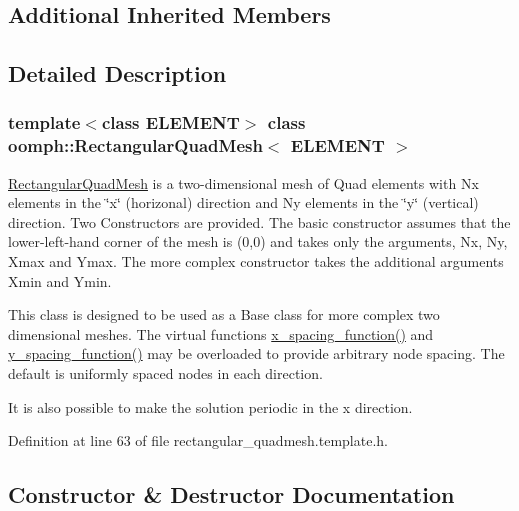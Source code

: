 \subsection*{Additional Inherited Members}


\subsection{Detailed Description}
\subsubsection*{template$<$class E\+L\+E\+M\+E\+NT$>$\newline
class oomph\+::\+Rectangular\+Quad\+Mesh$<$ E\+L\+E\+M\+E\+N\+T $>$}

\hyperlink{classoomph_1_1RectangularQuadMesh}{Rectangular\+Quad\+Mesh} is a two-\/dimensional mesh of Quad elements with Nx elements in the \char`\"{}x\char`\"{} (horizonal) direction and Ny elements in the \char`\"{}y\char`\"{} (vertical) direction. Two Constructors are provided. The basic constructor assumes that the lower-\/left-\/hand corner of the mesh is (0,0) and takes only the arguments, Nx, Ny, Xmax and Ymax. The more complex constructor takes the additional arguments Xmin and Ymin.

This class is designed to be used as a Base class for more complex two dimensional meshes. The virtual functions \hyperlink{classoomph_1_1RectangularQuadMesh_ad4c2f349cf201cb3107f0a4e5447c16f}{x\+\_\+spacing\+\_\+function()} and \hyperlink{classoomph_1_1RectangularQuadMesh_ae78204de1f176cdf2e819673bd34e78a}{y\+\_\+spacing\+\_\+function()} may be overloaded to provide arbitrary node spacing. The default is uniformly spaced nodes in each direction.

It is also possible to make the solution periodic in the x direction. 

Definition at line 63 of file rectangular\+\_\+quadmesh.\+template.\+h.



\subsection{Constructor \& Destructor Documentation}
\mbox{\label{classoomph_1_1RectangularQuadMesh_aeda49fb3896e9e3aec328391b196a6bf}} 
